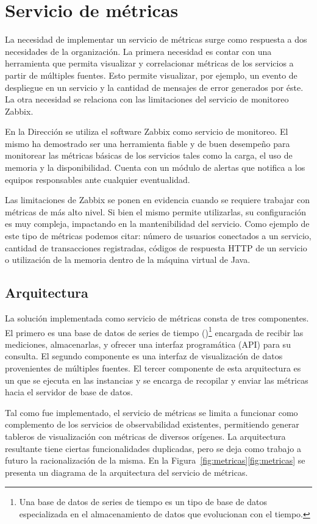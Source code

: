 %
%
\section{Servicio de métricas}
%
La necesidad de implementar un servicio de métricas surge como
respuesta a dos necesidades de la organización. La primera necesidad
es contar con una herramienta que permita visualizar y correlacionar
métricas de los servicios a partir de múltiples fuentes. Esto permite
visualizar, por ejemplo, un evento de despliegue en un servicio y la
cantidad de mensajes de error generados por éste. La otra necesidad se
relaciona con las limitaciones del servicio de monitoreo Zabbix.

En la Dirección se utiliza el software Zabbix como servicio de
monitoreo. El mismo ha demostrado ser una herramienta fiable y de buen
desempeño para monitorear las métricas básicas de los servicios tales
como la carga, el uso de memoria y la disponibilidad. Cuenta con un
módulo de alertas que notifica a los equipos responsables ante
cualquier eventualidad.

Las limitaciones de Zabbix se ponen en evidencia cuando se requiere
trabajar con métricas de más alto nivel. Si bien el mismo permite
utilizarlas, su configuración es muy compleja, impactando en la
mantenibilidad del servicio. Como ejemplo de este tipo de métricas
podemos citar: número de usuarios conectados a un servicio, cantidad
de transacciones registradas, códigos de respuesta HTTP de un servicio
o utilización de la memoria  dentro de la máquina virtual
de Java.
%
\subsection{Arquitectura}
%
La solución implementada como servicio de métricas consta de tres
componentes. El primero es una base de datos de series de tiempo
()\footnote{ Una base de datos de series de
  tiempo es un tipo de base de datos especializada en el
  almacenamiento de datos que evolucionan con el tiempo. } encargada
de recibir las mediciones, almacenarlas, y ofrecer una interfaz
programática (API) para su consulta. El segundo componente es una
interfaz de visualización de datos provenientes de múltiples
fuentes. El tercer componente de esta arquitectura es un 
que se ejecuta en las instancias y se encarga de recopilar y enviar
las métricas hacia el servidor de base de datos.

Tal como fue implementado, el servicio de métricas se limita a
funcionar como complemento de los servicios de observabilidad
existentes, permitiendo generar tableros de visualización con métricas
de diversos orígenes. La arquitectura resultante tiene ciertas
funcionalidades duplicadas, pero se deja como trabajo a futuro la
racionalización de la misma. En la
\iflatexml{}Figura~\ref{fig:metricas}\else\autoref{fig:metricas}\fi{}
se presenta un diagrama de la arquitectura del servicio de métricas.
